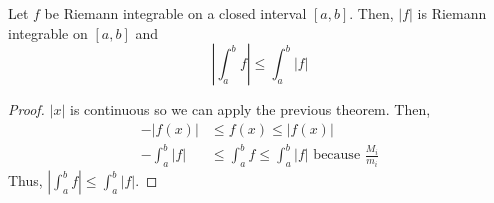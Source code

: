 \begin{theorem}{}{}
    Let $f$ be Riemann integrable on a closed interval $[a, b]$. Then, $|f|$ is Riemann integrable on $[a, b]$ and $$\left|\int_a^b f\right| \leq \int_a^b \left|f\right|$$
\end{theorem}
\begin{proof}
    $|x|$ is continuous so we can apply the previous theorem. Then,
    \begin{align*}
        -|f(x)| &\leq f(x) \leq |f(x)| \\
        -\int_a^b |f| &\leq \int_a^b f \leq \int_a^b |f| \text{ because } \frac{M_i}{m_i}
    \end{align*}
    Thus, $\left|\int_a^b f\right| \leq \int_a^b \left|f\right|$.
\end{proof}
